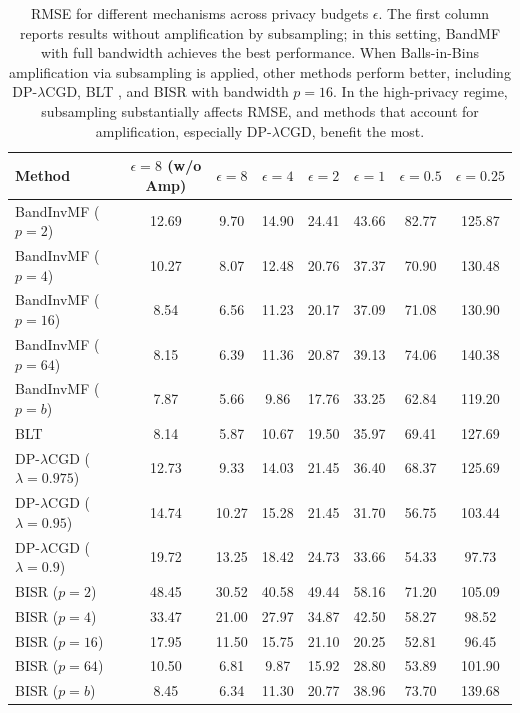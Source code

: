 \documentclass{article}
\theoremstyle{plain}
\theoremstyle{definition}
\theoremstyle{remark}
\newcommand{\method}{DP-$\lambda$CGD\xspace}
\begin{document}
\begin{table}[t]
\centering
\caption{RMSE for different mechanisms across privacy budgets $\epsilon$. The first column reports results without amplification by subsampling; in this setting, BandMF \citep{scalingmckenna2024} with full bandwidth achieves the best performance. When Balls-in-Bins amplification via subsampling is applied, other methods perform better, including \method, BLT \citep{dvijotham2024efficient}, and BISR \citep{kalinin2025back} with bandwidth $p=16$. In the high-privacy regime, subsampling substantially affects RMSE, and methods that account for amplification, especially \method, benefit the most.}
\label{tab:eps_all}
\begin{tabular}{lccccccc}
\toprule
Method & $\epsilon=8$ (w/o Amp) & $\epsilon=8$ & $\epsilon=4$ & $\epsilon=2$ & $\epsilon=1$ & $\epsilon=0.5$ & $\epsilon=0.25$ \\
\midrule
BandInvMF ($p=2$)  & 12.69 & 9.70  & 14.90 & 24.41 & 43.66 & 82.77 & 125.87 \\
BandInvMF ($p=4$)  & 10.27 & 8.07  & 12.48 & 20.76 & 37.37 & 70.90 & 130.48 \\
BandInvMF ($p=16$) & 8.54  & 6.56  & 11.23 & 20.17 & 37.09 & 71.08 & 130.90 \\
BandInvMF ($p=64$) & 8.15  & 6.39  & 11.36 & 20.87 & 39.13 & 74.06 & 140.38 \\
BandInvMF ($p=b$)  & 7.87  & 5.66  & 9.86  & 17.76 & 33.25 & 62.84 & 119.20 \\
\addlinespace
BLT & 8.14 & 5.87 & 10.67 & 19.50 & 35.97 & 69.41 & 127.69 \\
\addlinespace
DP-$\lambda$CGD ($\lambda=0.975$) & 12.73 & 9.33  & 14.03 & 21.45 & 36.40 & 68.37 & 125.69 \\
DP-$\lambda$CGD ($\lambda=0.95$)  & 14.74 & 10.27 & 15.28 & 21.45 & 31.70 & 56.75 & 103.44 \\
DP-$\lambda$CGD ($\lambda=0.9$)   & 19.72 & 13.25 & 18.42 & 24.73 & 33.66 & 54.33 & 97.73 \\
\addlinespace
BISR ($p=2$)  & 48.45 & 30.52 & 40.58 & 49.44 & 58.16 & 71.20 & 105.09 \\
BISR ($p=4$)  & 33.47 & 21.00 & 27.97 & 34.87 & 42.50 & 58.27 & 98.52 \\
BISR ($p=16$) & 17.95 & 11.50 & 15.75 & 21.10 & 20.25 & 52.81 & 96.45 \\
BISR ($p=64$) & 10.50 & 6.81  & 9.87  & 15.92 & 28.80 & 53.89 & 101.90 \\
BISR ($p=b$)  & 8.45  & 6.34  & 11.30 & 20.77 & 38.96 & 73.70 & 139.68 \\

\end{tabular}
\end{table}
\end{document}
